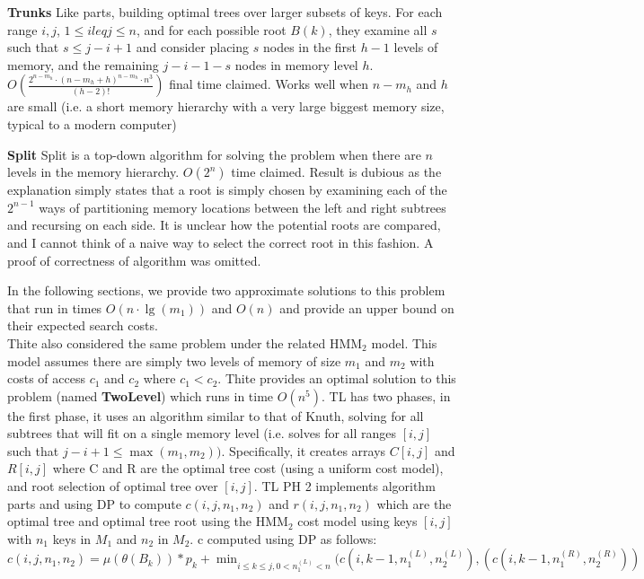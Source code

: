 \documentclass[letterpaper,12pt,titlepage,oneside,final]{book}
\theoremstyle{plain}
\begin{document}
\textbf{Trunks}
Like parts, building optimal trees over larger subsets of keys.
For each range $i,j$, $1 \leq i leq j \leq n$, and for each possible root $B(k)$, they examine all $s$ such that $s \leq j-i+1$ and consider placing $s$ nodes in the first $h-1$ levels of memory, and the remaining $j-i-1-s$ nodes in memory level $h$.
$O(\frac{2^{n-m_h}\cdot (n-m_h+h)^{n-m_h}\cdot n^3}{(h-2)!})$ final time claimed. Works well when $n-m_h$ and $h$ are small (i.e. a short memory hierarchy with a very large biggest memory size, typical to a modern computer)

\textbf{Split}
Split is a top-down algorithm for solving the problem when there are $n$ levels in the memory hierarchy. $O(2^n)$ time claimed. Result is dubious as the explanation simply states that a root is simply chosen by examining each of the $2^{n-1}$ ways of partitioning memory locations between the left and right subtrees and recursing on each side. It is unclear how the potential roots are compared, and I cannot think of a naive way to select the correct root in this fashion. A proof of correctness of algorithm was omitted.

 In the following sections, we provide two approximate solutions to this problem that run in times $O(n \cdot \lg(m_1))$ and $O(n)$ and provide an upper bound on their expected search costs.  \\

Thite also considered the same problem under the related HMM$_2$ model. This model assumes there are simply two levels of memory of size $m_1$ and $m_2$ with costs of access $c_1$ and $c_2$ where $c_1 < c_2$. Thite provides an optimal solution to this problem (named \textbf{TwoLevel}) which runs in time $O(n^5)$.
TL has two phases, in the first phase, it uses an algorithm similar to that of Knuth, solving for all subtrees that will fit on a single memory level (i.e. solves for all ranges $[i,j]$ such that $j-i+1 \leq \max(m_1, m_2))$. Specifically, it creates arrays $C[i,j]$ and $R[i,j]$ where C and R are the optimal tree cost (using a uniform cost model), and root selection of optimal tree over $[i,j]$.
TL PH 2 implements algorithm parts and using DP to compute $c(i,j,n_1,n_2)$ and $r(i,j,n_1, n_2)$ which are the optimal tree and optimal tree root using the HMM$_2$ cost model using keys $[i,j]$ with $n_1$ keys in $M_1$ and $n_2$ in $M_2$. c computed using DP as follows:
$c(i,j,n_1,n_2) = \mu ( \theta ( B_k))* p_k + \min_{i \leq k \leq j, 0 < n_1^{(L)} < n} (c(i, k-1, n_1^{(L)}, n_2^{(L)}), (c(i, k-1, n_1^{(R)}, n_2^{(R)}))$
\end{document}
